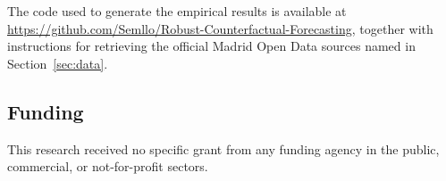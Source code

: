 The code used to generate the empirical results is available at \url{https://github.com/Semllo/Robust-Counterfactual-Forecasting}, together with instructions for retrieving the official Madrid Open Data sources named in Section~\ref{sec:data}.

\subsection*{Funding}
This research received no specific grant from any funding agency in the public, commercial, or not-for-profit sectors.
